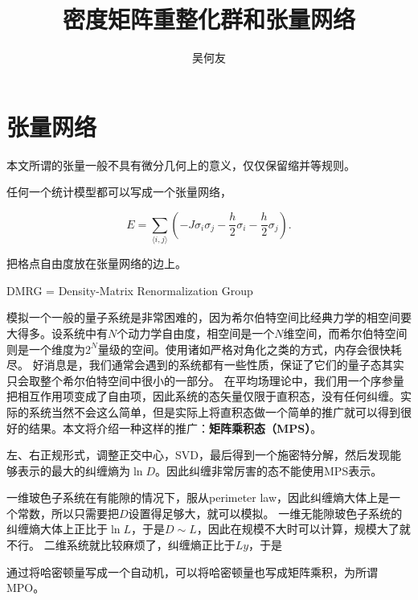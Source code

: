 \documentclass[hyperref, UTF8, a4paper]{ctexart}
\title{密度矩阵重整化群和张量网络}
\author{吴何友}
\newcommand*{\pair}[1]{\langle #1 \rangle}
\newcommand*{\concept}[1]{{\textbf{#1}}}
\begin{document}
\maketitle

\section{张量网络}

本文所谓的张量一般不具有微分几何上的意义，仅仅保留缩并等规则。

任何一个统计模型都可以写成一个张量网络，

\begin{equation}
    E = \sum_{\pair{i, j}} \left( - J \sigma_i \sigma_j - \frac{h}{2} \sigma_i - \frac{h}{2} \sigma_j \right).
\end{equation}

把格点自由度放在张量网络的边上。

DMRG = Density-Matrix Renormalization Group

模拟一个一般的量子系统是非常困难的，因为希尔伯特空间比经典力学的相空间要大得多。设系统中有$N$个动力学自由度，相空间是一个$N$维空间，而希尔伯特空间则是一个维度为$2^N$量级的空间。使用诸如严格对角化之类的方式，内存会很快耗尽。
好消息是，我们通常会遇到的系统都有一些性质，保证了它们的量子态其实只会取整个希尔伯特空间中很小的一部分。
在平均场理论中，我们用一个序参量把相互作用项变成了自由项，因此系统的态矢量仅限于直积态，没有任何纠缠。实际的系统当然不会这么简单，但是实际上将直积态做一个简单的推广就可以得到很好的结果。本文将介绍一种这样的推广：\concept{矩阵乘积态（MPS）}。

左、右正规形式，调整正交中心，SVD，最后得到一个施密特分解，然后发现能够表示的最大的纠缠熵为$\ln D$。因此纠缠非常厉害的态不能使用MPS表示。

一维玻色子系统在有能隙的情况下，服从perimeter law，因此纠缠熵大体上是一个常数，所以只需要把$D$设置得足够大，就可以模拟。
一维无能隙玻色子系统的纠缠熵大体上正比于$\ln L$，于是$D \sim L$，因此在规模不大时可以计算，规模大了就不行。
二维系统就比较麻烦了，纠缠熵正比于$L y$，于是

通过将哈密顿量写成一个自动机，可以将哈密顿量也写成矩阵乘积，为所谓MPO。
\end{document}
